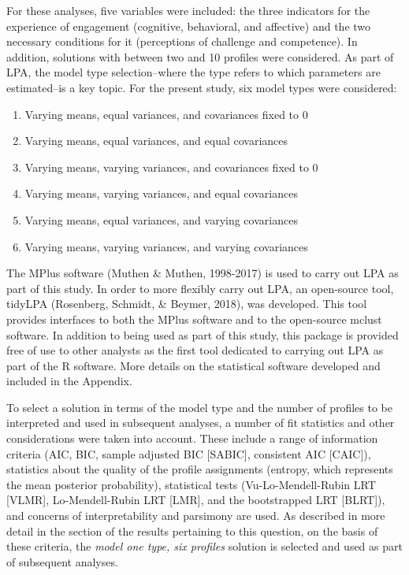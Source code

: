 \documentclass[]{msu-thesis}
\providecommand{\tightlist}{%
  \setlength{\itemsep}{0pt}\setlength{\parskip}{0pt}}
\theoremstyle{definition}
\theoremstyle{definition}
\theoremstyle{definition}
\theoremstyle{remark}
\begin{document}
For these analyses, five variables were included: the three indicators
for the experience of engagement (cognitive, behavioral, and affective)
and the two necessary conditions for it (perceptions of challenge and
competence). In addition, solutions with between two and 10 profiles
were considered. As part of LPA, the model type selection--where the
type refers to which parameters are estimated--is a key topic. For the
present study, six model types were considered:

\begin{enumerate}
\def\labelenumi{\arabic{enumi}.}
\tightlist
\item
  Varying means, equal variances, and covariances fixed to 0
\item
  Varying means, equal variances, and equal covariances
\item
  Varying means, varying variances, and covariances fixed to 0
\item
  Varying means, varying variances, and equal covariances
\item
  Varying means, equal variances, and varying covariances
\item
  Varying means, varying variances, and varying covariances
\end{enumerate}

The MPlus software (Muthen \& Muthen, 1998-2017) is used to carry out
LPA as part of this study. In order to more flexibly carry out LPA, an
open-source tool, tidyLPA (Rosenberg, Schmidt, \& Beymer, 2018), was
developed. This tool provides interfaces to both the MPlus software and
to the open-source mclust software. In addition to being used as part of
this study, this package is provided free of use to other analysts as
the first tool dedicated to carrying out LPA as part of the R software.
More details on the statistical software developed and included in the
Appendix.

To select a solution in terms of the model type and the number of
profiles to be interpreted and used in subsequent analyses, a number of
fit statistics and other considerations were taken into account. These
include a range of information criteria (AIC, BIC, sample adjusted BIC
{[}SABIC{]}, consistent AIC {[}CAIC{]}), statistics about the quality of
the profile assignments (entropy, which represents the mean posterior
probability), statistical tests (Vu-Lo-Mendell-Rubin LRT {[}VLMR{]},
Lo-Mendell-Rubin LRT {[}LMR{]}, and the bootstrapped LRT {[}BLRT{]}),
and concerns of interpretability and parsimony are used. As described in
more detail in the section of the results pertaining to this question,
on the basis of these criteria, the \emph{model one type, six profiles}
solution is selected and used as part of subsequent analyses.
\end{document}
